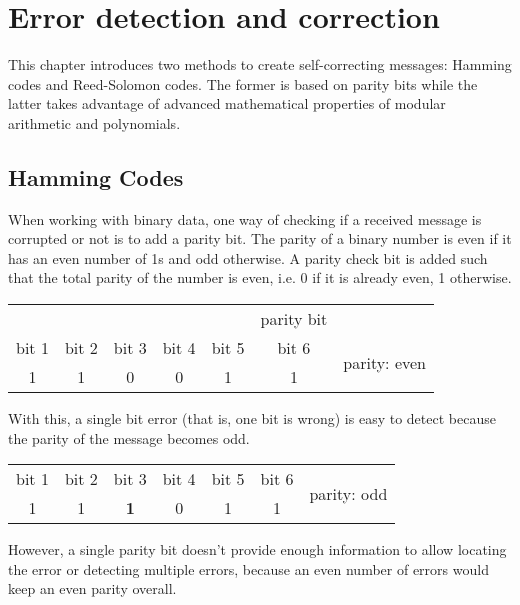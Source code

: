 \chapter{Error detection and correction}
\label{chap:err_corr}

This chapter introduces two methods to create self-correcting messages: Hamming codes and Reed-Solomon codes. The former is based on parity bits while the latter takes advantage of advanced mathematical properties of modular arithmetic and polynomials.

\section{Hamming Codes}
\label{sec:hamming}

When working with binary data, one way of checking if a received message is corrupted or not is to add a parity bit. The parity of a binary number is even if it has an even number of 1s and odd otherwise. A parity check bit is added such that the total parity of the number is even, i.e. 0 if it is already even, 1 otherwise.

\def\arraystretch{1.2}
\begin{center}
  \begin{tabular}{|c|c|c|c|c||c|c}
    \multicolumn{5}{c}{} & \multicolumn{1}{c}{parity bit} & \\
    \cline{1-6}
    bit 1 & bit 2 & bit 3 & bit 4 & bit 5 & bit 6 & \multirow{2}{*}{parity: even} \\
    \cline{1-6}
    1 & 1 & 0 & 0 & 1 & 1 & \\
    \cline{1-6}
  \end{tabular}
\end{center}
\def\arraystretch{1}

With this, a single bit error (that is, one bit is wrong) is easy to detect because the parity of the message becomes odd.

\def\arraystretch{1.2}
\begin{center}
  \begin{tabular}{|c|c|c|c|c|c|c}
    \cline{1-6}
    bit 1 & bit 2 & bit 3 & bit 4 & bit 5 & bit 6 & \multirow{2}{*}{parity: odd} \\
    \cline{1-6}
    1 & 1 & \textbf{1} & 0 & 1 & 1 & \\
    \cline{1-6}
  \end{tabular}
\end{center}
\def\arraystretch{1}

However, a single parity bit doesn't provide enough information to allow locating the error or detecting multiple errors, because an even number of errors would keep an even parity overall.

